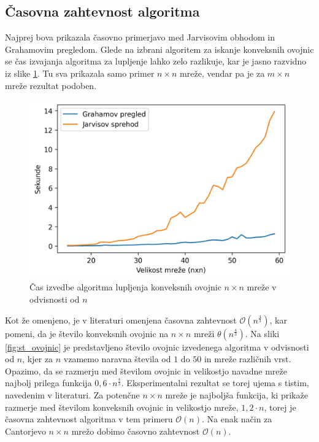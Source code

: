 \documentclass[a4paper]{article}
\begin{document}
\newpage
\subsection{Časovna zahtevnost algoritma}
Najprej bova prikazala časovno primerjavo med Jarvisovim obhodom in Grahamovim pregledom. Glede na izbrani algoritem za iskanje konveksnih ovojnic se čas izvajanja algoritma za lupljenje
lahko zelo razlikuje, kar je jasno razvidno iz slike \ref{fig:cas}. Tu sva prikazala samo primer $n \times n$ mreže, vendar pa je za $m \times n$ mreže rezultat podoben.

\begin{figure}[!h]
	\centering
	\caption{Čas izvedbe algoritma lupljenja konveksnih ovojnic $n \times n$ mreže v odvisnosti od $n$}
	\label{fig:cas}
	\includegraphics[scale=0.6]{slike/cas.jpg}
\end{figure}

Kot že omenjeno, je v literaturi omenjena časovna zahtevnost $\mathcal{O}(n ^ \frac{4}{3})$, kar pomeni, da je število konveksnih ovojnic na $n \times n$ mreži $\theta(n ^ \frac{4}{3})$.
Na sliki \ref{fig:st_ovojnic} je predstavljeno število ovojnic izvedenega algoritma v odvisnosti od $n$, kjer za $n$ vzamemo naravna števila od $1$ do $50$ in mreže različnih vrst. 
Opazimo, da se razmerju med številom ovojnic in velikostjo navadne mreže najbolj prilega funkcija $0,6 \cdot n ^ \frac{4}{3}$. Eksperimentalni rezultat se torej ujema s tistim, navedenim v 
literaturi. Za potenčne $n \times n$ mreže je najboljša funkcija, ki prikaže razmerje med številom konveksnih ovojnic in velikostjo mreže, $1,2 \cdot n$, torej je časovna zahtevnost algoritma
v tem primeru $\mathcal{O}(n)$. Na enak način za Cantorjevo $n \times n$ mrežo dobimo časovno zahtevnost $\mathcal{O}(n)$.
\end{document}
